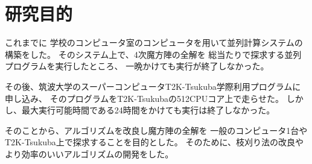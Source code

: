 \section{研究目的}
これまでに
学校のコンピュータ室のコンピュータを用いて並列計算システムの構築をした。
そのシステム上で、4次魔方陣の全解を
総当たりで探求する並列プログラムを実行したところ、
一晩かけても実行が終了しなかった。

その後、筑波大学のスーパーコンピュータT2K-Tsukuba学際利用プログラムに申し込み、
そのプログラムをT2K-Tsukubaの512CPUコア上で走らせた。
しかし、最大実行可能時間である24時間をかけても実行は終了しなかった。

そのことから、アルゴリズムを改良し魔方陣の全解を
一般のコンピュータ1台やT2K-Tsukuba上で探求することを目的とした。
そのために、枝刈り法の改良やより効率のいいアルゴリズムの開発をした。
